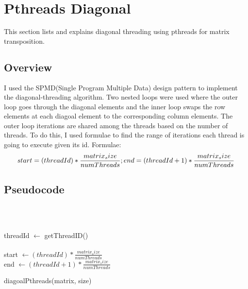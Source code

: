 \documentclass[12pt, a4paper, fleqn, titlepage]{article}
\begin{document}
\section{Pthreads Diagonal} \label{pthreads}

    This section lists and explains diagonal threading using pthreads for matrix transposition.

    \subsection{Overview}
        I used the SPMD(Single Program Multiple Data) design pattern to implement the diagonal-threading algorithm. Two nested loops were used where the outer loop goes through the diagonal elements and the inner loop swaps the row elements at each diagoal
        element to the corresponding column elements. 
        The outer loop iterations are shared among the threads based on the number of threads. To do this, I used formulae to find
        the range of iterations each thread is going to execute given its id. 
        Formulae:
        \[start = (threadId) * \frac{matrix_size}{numThreads};\\
        end = (threadId+1) * \frac{matrix_size}{numThreads}\]

    \subsection{Pseudocode}
        \begin{algorithm}[H]
            \\
            \\
            \linebreak
            
            threadId $\leftarrow$ getThreadID() \\
            \\

            start $\leftarrow (threadId) * \frac{matrix_size}{numThreads}$ \\
            end $\leftarrow (threadId+1) * \frac{matrix_size}{numThreads}$\\



            \begin{flushleft}
                \caption{diagoalPthreads(matrix, size)}
            \end{flushleft}
        \end{algorithm}
\end{document}
